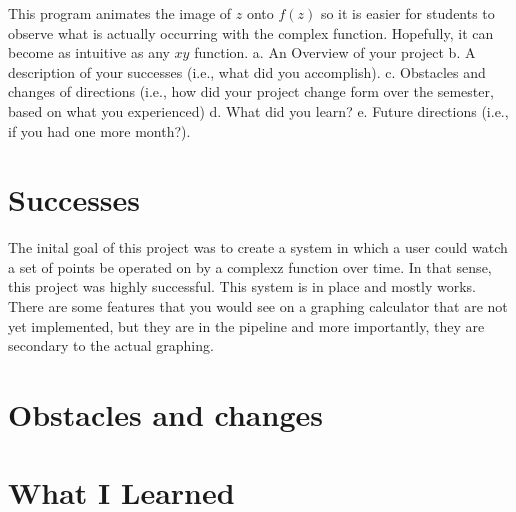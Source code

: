 \documentclass{article}
\begin{document}
    This program animates the image of $z$ onto $f(z)$ so it is easier for students to observe what is actually occurring with the complex function. Hopefully, it can become as intuitive as any $xy$ function.
    a.  An Overview of your project
    b.  A description of your successes (i.e., what did you accomplish).
    c.  Obstacles and changes of directions (i.e., how did your project change form over the semester, based on what you experienced)
    d.  What did you learn?  
    e.  Future directions (i.e., if you had one more month?).
\section{Successes}
    The inital goal of this project was to create a system in which a user could watch a set of points be operated on by a complexz function over time. In that sense, this project was highly successful. This system is in place and mostly works. There are some features that you would see on a graphing calculator that are not yet implemented, but they are in the pipeline and more importantly, they are secondary to the actual graphing.
\section{Obstacles and changes}
\section{What I Learned}
\end{document}
